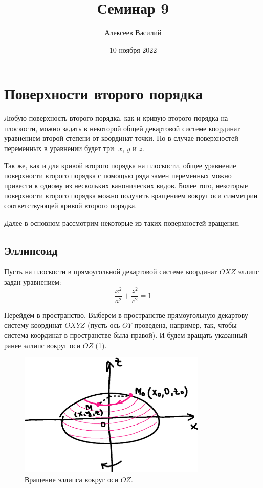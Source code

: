 \documentclass[a4paper,12pt]{article}
\author{Алексеев Василий}
\title{Семинар 9}
\date{10 ноября 2022}
\begin{document}
  \maketitle
  
  \tableofcontents

  \thispagestyle{empty}
  
  \newpage
  


  \section{Поверхности второго порядка}
  
  Любую поверхность второго порядка, как и кривую второго порядка на плоскости, можно задать в некоторой общей декартовой системе координат уравнением второй степени от координат точки.
  Но в случае поверхностей переменных в уравнении будет три: $x$, $y$ и $z$.
  
  Так же, как и для кривой второго порядка на плоскости, общее уравнение поверхности второго порядка с помощью ряда замен переменных можно привести к одному из нескольких канонических видов.  %
  Более того, некоторые поверхности второго порядка можно получить вращением вокруг оси симметрии соответствующей кривой второго порядка.
  
  Далее в основном рассмотрим некоторые из таких поверхностей вращения.
  
  
  \subsection{Эллипсоид}
  
  Пусть на плоскости в прямоугольной декартовой системе координат $OXZ$ эллипс задан уравнением:
  \[
    \frac{x^2}{a^2} + \frac{z^2}{c^2} = 1
  \]
  
  Перейдём в пространство.
  Выберем в пространстве прямоугольную декартову систему координат $OXYZ$ (пусть ось $OY$ проведена, например, так, чтобы система координат в пространстве была правой).
  И будем вращать указанный ранее эллипс вокруг оси $OZ$ (\ref{fig:ellipse-rotate-1}).
  
  \begin{figure}[h]
    \centering

    \includegraphics[width=0.8\textwidth]{ellipse-rotate-1}
  
    \caption{Вращение эллипса вокруг оси $OZ$.}
    \label{fig:ellipse-rotate-1}
  \end{figure}
  
\end{document}
